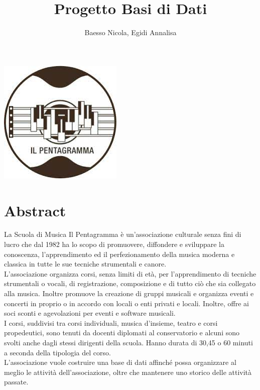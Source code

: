 \documentclass[12pt]{article}
\title{Progetto Basi di Dati}
\author{Baesso Nicola, Egidi Annalisa}
\begin{document}

\maketitle %
\begin{center} %
	\includegraphics{logo.jpeg}	
\end{center}
\newpage %
\tableofcontents %
\newpage
\section{Abstract}
La Scuola di Musica Il Pentagramma è un’associazione culturale senza fini di lucro che dal 1982 ha lo scopo di promuovere, diffondere e sviluppare la conoscenza, l’apprendimento ed il perfezionamento della musica moderna e classica in tutte le sue tecniche strumentali e canore.\\
L'associazione organizza corsi, senza limiti di età, per l'apprendimento di tecniche strumentali o vocali, di registrazione, composizione e di tutto ciò che sia collegato alla musica. Inoltre promuove la creazione di gruppi musicali e organizza eventi e concerti in proprio o in accordo con locali o enti privati e locali. Inoltre, offre ai soci sconti e agevolazioni per eventi e software musicali.\\
I corsi, suddivisi tra corsi individuali, musica d'insieme, teatro e corsi propedeutici, sono tenuti da docenti diplomati al conservatorio e alcuni sono svolti anche dagli stessi dirigenti della scuola. Hanno durata di 30,45 o 60 minuti a seconda della tipologia del corso.\\
L'associazione vuole costruire una base di dati affinché possa organizzare al meglio le attività dell'associazione, oltre che mantenere uno storico delle attività passate.
\end{document}
